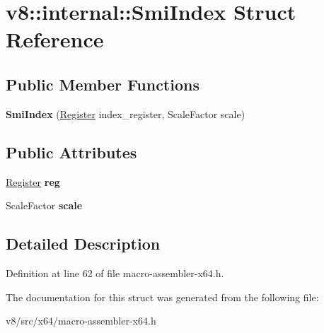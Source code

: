 \hypertarget{structv8_1_1internal_1_1SmiIndex}{}\section{v8\+:\+:internal\+:\+:Smi\+Index Struct Reference}
\label{structv8_1_1internal_1_1SmiIndex}
\subsection*{Public Member Functions}
\begin{DoxyCompactItemize}
\item 
\mbox{\label{structv8_1_1internal_1_1SmiIndex_a2ee8fe322cc99e028ea9684e3acc9470}} 
{\bfseries Smi\+Index} (\mbox{\hyperlink{classv8_1_1internal_1_1Register}{Register}} index\+\_\+register, Scale\+Factor scale)
\end{DoxyCompactItemize}
\subsection*{Public Attributes}
\begin{DoxyCompactItemize}
\item 
\mbox{\label{structv8_1_1internal_1_1SmiIndex_aaf56c81c61f966fe43eb44d473206b52}} 
\mbox{\hyperlink{classv8_1_1internal_1_1Register}{Register}} {\bfseries reg}
\item 
\mbox{\label{structv8_1_1internal_1_1SmiIndex_ae40059bb0f0f42f6f98a0d6a2d827843}} 
Scale\+Factor {\bfseries scale}
\end{DoxyCompactItemize}


\subsection{Detailed Description}


Definition at line 62 of file macro-\/assembler-\/x64.\+h.



The documentation for this struct was generated from the following file\+:\begin{DoxyCompactItemize}
\item 
v8/src/x64/macro-\/assembler-\/x64.\+h\end{DoxyCompactItemize}

